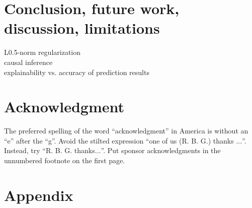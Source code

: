 \documentclass[conference]{IEEEtran}
\begin{document}
\section{Conclusion, future work, discussion, limitations}
L0.5-norm regularization\\
causal inference\\
explainability vs. accuracy of prediction results\\
\color{black}



\section*{Acknowledgment}

The preferred spelling of the word ``acknowledgment'' in America is without 
an ``e'' after the ``g''. Avoid the stilted expression ``one of us (R. B. 
G.) thanks $\ldots$''. Instead, try ``R. B. G. thanks$\ldots$''. Put sponsor 
acknowledgments in the unnumbered footnote on the first page.








\section{Appendix}
\label{sec:Appendix}
\end{document}
